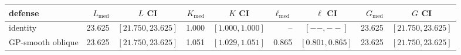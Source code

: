 \footnotesize
\setlength{\tabcolsep}{3pt}
\begin{tabular}{l r c r c r c r c}
\toprule
defense & $L_{\mathrm{med}}$ & $L$ CI & $K_{\mathrm{med}}$ & $K$ CI & $\ell_{\mathrm{med}}$ & $\ell$ CI & $G_{\mathrm{med}}$ & $G$ CI \\
\midrule
identity & 23.625 & $[21.750, 23.625]$ & 1.000 & $[1.000, 1.000]$ & -- & $[--, --]$ & 23.625 & $[21.750, 23.625]$ \\
GP-smooth oblique & 23.625 & $[21.750, 23.625]$ & 1.051 & $[1.029, 1.051]$ & 0.865 & $[0.801, 0.865]$ & 23.625 & $[21.750, 23.625]$ \\
\bottomrule
\end{tabular}

